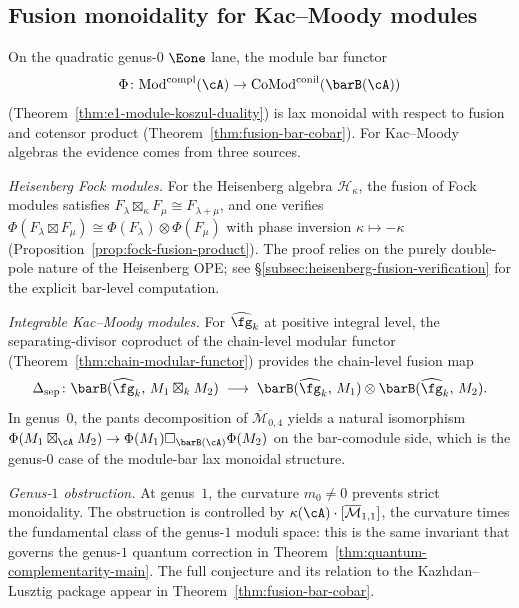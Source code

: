 \subsection{Fusion monoidality for Kac--Moody modules}
\label{subsec:km-fusion-monoidality}

On the quadratic genus-$0$ $\Eone$ lane, the module bar functor
\[
\Phi\colon \mathrm{Mod}^{\mathrm{compl}}(\cA)
\to \mathrm{CoMod}^{\mathrm{conil}}(\barB(\cA))
\]
\textup{(}Theorem~\textup{\ref{thm:e1-module-koszul-duality})}
is lax monoidal with respect to
fusion and cotensor product
(Theorem~\ref{thm:fusion-bar-cobar}). For Kac--Moody
algebras the evidence comes from three sources.

\emph{Heisenberg Fock modules.}
For the Heisenberg algebra $\mathcal{H}_\kappa$, the fusion of
Fock modules satisfies
$F_\lambda \boxtimes_\kappa F_\mu \cong F_{\lambda+\mu}$,
and one verifies
$\Phi(F_\lambda \boxtimes F_\mu)
\cong \Phi(F_\lambda) \otimes \Phi(F_\mu)$
with phase inversion $\kappa \mapsto -\kappa$
(Proposition~\ref{prop:fock-fusion-product}). The proof relies
on the purely double-pole nature of the Heisenberg OPE; see
\S\ref{subsec:heisenberg-fusion-verification} for the explicit
bar-level computation.

\emph{Integrable Kac--Moody modules.}
For $\widehat{\fg}_k$ at positive integral level, the
separating-divisor coproduct of the chain-level modular functor
(Theorem~\ref{thm:chain-modular-functor}) provides the
chain-level fusion map
\[
\Delta_{\mathrm{sep}}\colon
\barB(\widehat{\fg}_k,\, M_1 \boxtimes_k M_2)
\;\longrightarrow\;
\barB(\widehat{\fg}_k,\, M_1)
\otimes \barB(\widehat{\fg}_k,\, M_2).
\]
In genus~$0$, the pants decomposition of
$\overline{\mathcal{M}}_{0,4}$ yields a natural isomorphism
$\Phi(M_1 \boxtimes_\cA M_2)
\to \Phi(M_1) \square_{\barB(\cA)} \Phi(M_2)$
on the bar-comodule side, which is the genus-$0$ case of the
module-bar lax monoidal structure.

\emph{Genus-$1$ obstruction.}
At genus~$1$, the curvature $m_0 \neq 0$ prevents strict
monoidality. The obstruction is controlled by
$\kappa(\cA) \cdot [\overline{\mathcal{M}}_{1,1}]$, the
curvature times the fundamental class of the genus-$1$ moduli
space: this is the same invariant that governs the
genus-$1$ quantum correction in
Theorem~\ref{thm:quantum-complementarity-main}. The full
conjecture and its relation to the Kazhdan--Lusztig package
appear in Theorem~\ref{thm:fusion-bar-cobar}.

